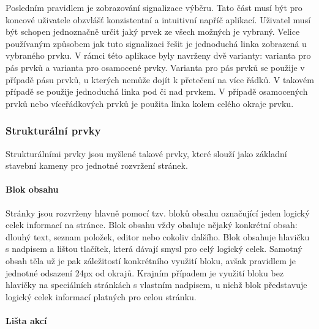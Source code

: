 		Posledním pravidlem je zobrazování signalizace výběru.
		Tato část musí být pro koncové uživatele obzvlášť konzistentní a intuitivní napříč aplikací.
		Uživatel musí být schopen jednoznačně určit jaký prvek ze všech možných je vybraný.
		Velice používaným způsobem jak tuto signalizaci řešit je jednoduchá linka zobrazená u vybraného prvku.
		V rámci této aplikace byly navrženy dvě varianty: varianta pro pás prvků a varianta pro osamocené prvky.
		Varianta pro pás prvků se použije v případě pásu prvků, u kterých nemůže dojít k přetečení na více řádků.
		V takovém případě se použije jednoduchá linka pod či nad prvkem.
		V případě osamocených prvků nebo víceřádkových prvků je použita linka kolem celého okraje prvku.



		\subsubsection{Strukturální prvky}

		Strukturálními prvky jsou myšlené takové prvky, které slouží jako základní stavební kameny pro jednotné
		rozvržení stránek.

			\paragraph{Blok obsahu}

			Stránky jsou rozvrženy hlavně pomocí tzv. bloků obsahu označující jeden logický celek informací
			na stránce.
			Blok obsahu vždy obaluje nějaký konkrétní obsah: dlouhý text, seznam položek, editor nebo cokoliv dalšího.
			Blok obsahuje hlavičku s nadpisem a lištou tlačítek, která dávají smysl pro celý logický celek.
			Samotný obsah těla už je pak záležitostí konkrétního využití bloku, avšak pravidlem je jednotné odsazení 24px od
			okrajů.
			Krajním případem je využití bloku bez hlavičky na speciálních stránkách s vlastním nadpisem, u nichž blok
			představuje logický celek informací platných pro celou stránku.


			\paragraph{Lišta akcí}

